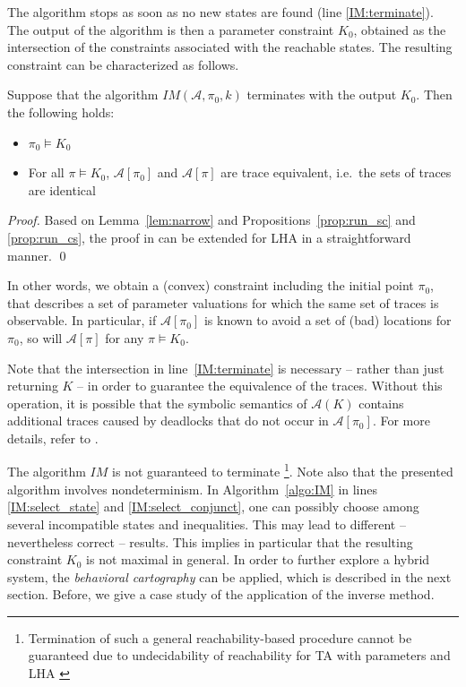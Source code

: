 \documentclass{llncs}
\newcommand{\IM}{\ensuremath{\mathit{IM}}}
\newcommand{\A}{\ensuremath{\mathcal{A}}}
\begin{document}
The algorithm stops as soon as no new states are found (line
\ref{IM:terminate}). The output of the algorithm is then a parameter
constraint $K_0$, obtained as the intersection of the constraints
associated with the reachable states.  The resulting constraint can be
characterized as follows.

\begin{proposition}
  Suppose that the algorithm $\IM(\A, \pi_0, k)$ terminates with the
  output $K_0$. Then the following holds:
  \begin{itemize}
  \item $\pi_0 \models K_0$
  \item For all $\pi \models K_0$, $\A[\pi_0]$
    and $\A[\pi]$ are trace equivalent, i.e.~the sets of traces are identical 
  \end{itemize}
\end{proposition}
\begin{proof}
  Based on Lemma~\ref{lem:narrow} and Propositions~\ref{prop:run_sc}
  and \ref{prop:run_cs}, the proof in \cite{ACEF:2009} can be extended
  for LHA in a straightforward manner. \qed
\end{proof}

In other words, we obtain a (convex) constraint including the initial
point $\pi_0$, that describes a set of parameter valuations for which
the same set of traces is observable. In particular, if $\A[\pi_0]$ is
known to avoid a set of (bad) locations for $\pi_0$, so will $\A[\pi]$
for any $\pi \models K_0$.

Note that the intersection in line~\ref{IM:terminate} is necessary --
rather than just returning $K$ -- in order to guarantee the
equivalence of the traces. Without this operation, it is possible that
the symbolic semantics of $\A(K)$ contains additional traces caused by
deadlocks that do not occur in $\A[\pi_0]$. For more details, refer to
\cite{ACEF:2009}. 

The algorithm $\IM$ is not guaranteed to terminate
\footnote{Termination of such a general reachability-based procedure
  cannot be guaranteed due to undecidability of reachability for TA
  with parameters and LHA \cite{HKPV:95}}.  Note also that the
presented algorithm involves nondeterminism. In
Algorithm~\ref{algo:IM} in lines \ref{IM:select_state} and
\ref{IM:select_conjunct}, one can possibly choose among several
incompatible states and inequalities. This may lead to different --
nevertheless correct -- results. This implies in particular that the
resulting constraint $K_0$ is not maximal in general. In order to
further explore a hybrid system, the \emph{behavioral cartography} can
be applied, which is described in the next section. Before, we give
a case study of the application of the inverse method.
\end{document}
